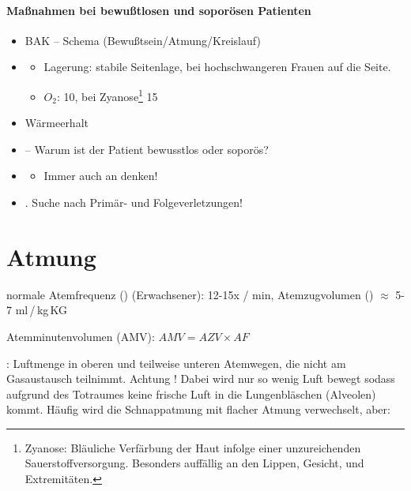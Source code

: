 \begin{gMassnahmenEnv}
    \paragraph{Ma{\ss}nahmen bei bewu{\ss}tlosen und sopor\"osen Patienten}
    \begin{itemize}
        \item BAK -- Schema  (Bewu{\ss}tsein/Atmung/Kreislauf)
        \item \gTxMassVitBes
        \begin{itemize}
            \item Lagerung: stabile Seitenlage, bei hochschwangeren Frauen auf die
         Seite. 
            \item $O_2$:  10\gLMin , bei
            Zyanose\footnote{Zyanose: Bl\"auliche Verf\"arbung der Haut infolge einer unzureichenden
            Sauerstoffversorgung. Besonders auff\"allig an den Lippen, Gesicht, und
            Extremit\"aten.}  15\gLMin
        \end{itemize}
        \item W\"armeerhalt
        \item {} -- Warum ist der Patient bewusstlos oder
        sopor\"os?
        \item {}
        \begin{itemize}
            \item Immer auch an  denken!
        \end{itemize}
        \item {}. Suche nach Primär- und
        Folgeverletzungen!
    \end{itemize}
\end{gMassnahmenEnv}



\section{Atmung}


normale Atemfrequenz () (Erwachsener): 12-15x / min,
Atemzugvolumen () $\approx$ 5-7 ml\,/\,kg\,KG

Atemminutenvolumen (AMV): $AMV = AZV \times AF$

: Luftmenge
in oberen  und teilweise unteren Atemwegen, die  nicht am Gasaustausch teilnimmt.
Achtung ! Dabei wird
nur so wenig Luft bewegt sodass aufgrund des Totraumes keine frische Luft in die
Lungenbl\"aschen (Alveolen) kommt. H\"aufig wird die Schnappatmung mit
flacher Atmung verwechselt, aber:

